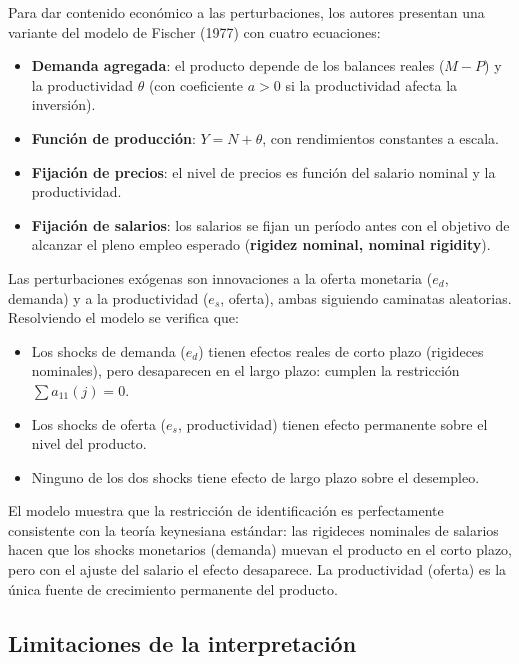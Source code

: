 \documentclass[12pt]{article}
\begin{document}
Para dar contenido econ\'omico a las perturbaciones, los autores presentan una variante del modelo de Fischer (1977) con cuatro ecuaciones:
\begin{itemize}
  \item \textbf{Demanda agregada}: el producto depende de los balances reales ($M - P$) y la productividad $\theta$ (con coeficiente $a > 0$ si la productividad afecta la inversi\'on).
  \item \textbf{Funci\'on de producci\'on}: $Y = N + \theta$, con rendimientos constantes a escala.
  \item \textbf{Fijaci\'on de precios}: el nivel de precios es funci\'on del salario nominal y la productividad.
  \item \textbf{Fijaci\'on de salarios}: los salarios se fijan un per\'iodo antes con el objetivo de alcanzar el pleno empleo esperado (\textbf{rigidez nominal, nominal rigidity}).
\end{itemize}

Las perturbaciones ex\'ogenas son innovaciones a la oferta monetaria ($e_d$, demanda) y a la productividad ($e_s$, oferta), ambas siguiendo caminatas aleatorias. Resolviendo el modelo se verifica que:
\begin{itemize}
  \item Los shocks de demanda ($e_d$) tienen efectos reales de corto plazo (rigideces nominales), pero desaparecen en el largo plazo: cumplen la restricci\'on $\sum a_{11}(j) = 0$.
  \item Los shocks de oferta ($e_s$, productividad) tienen efecto permanente sobre el nivel del producto.
  \item Ninguno de los dos shocks tiene efecto de largo plazo sobre el desempleo.
\end{itemize}

\begin{intuicion}
El modelo muestra que la restricci\'on de identificaci\'on es perfectamente consistente con la teor\'ia keynesiana est\'andar: las rigideces nominales de salarios hacen que los shocks monetarios (demanda) muevan el producto en el corto plazo, pero con el ajuste del salario el efecto desaparece. La productividad (oferta) es la \'unica fuente de crecimiento permanente del producto.
\end{intuicion}

\subsection{Limitaciones de la interpretaci\'on}
\end{document}
